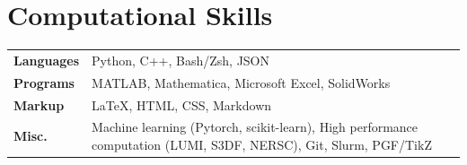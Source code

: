 \documentclass[a4paper,11pt]{article}
\begin{document}
\section{Computational Skills}
\begin{tabularx}{\linewidth}{@{}l X@{}}
\textbf{Languages} & Python, C++, Bash/Zsh, JSON \\
\textbf{Programs} & MATLAB, Mathematica, Microsoft Excel, SolidWorks \\
\textbf{Markup} & \LaTeX, HTML, CSS, Markdown \\
\textbf{Misc.} & Machine learning (Pytorch, scikit-learn), High performance computation (LUMI, S3DF, NERSC), Git, Slurm, PGF/TikZ
\end{tabularx}

\end{document}
